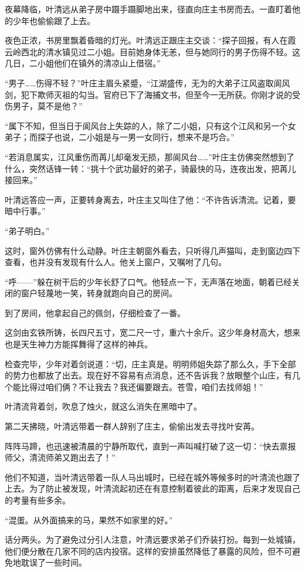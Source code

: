 夜幕降临，叶清远从弟子房中蹑手蹑脚地出来，径直向庄主书房而去。一直盯着他的少年也偷偷跟了上去。

夜色正浓，书房里飘着昏暗的灯光。叶清远正跟庄主交谈：“探子回报，有人在霞云岭西北的清水镇见过二小姐。目前她身体无恙，但与她同行的男子伤得不轻。这几日，二小姐他们在镇外的清凉山上借宿。”

“男子……伤得不轻？”叶庄主眉头紧蹙，“江湖盛传，无为的大弟子江风盗取阆风剑，犯下欺师灭祖的勾当。官府已下了海捕文书，但至今一无所获。你刚才说的受伤男子，莫不是他？”

“属下不知，但当日于阆风台上失踪的人，除了二小姐，只有这个江风和另一个女弟子；而探子也说，二小姐是与一男一女同行，想来不是巧合。”

“若消息属实，江风重伤而苒儿却毫发无损，那阆风台……”叶庄主仿佛突然想到了什么，突然话锋一转：“挑十个武功最好的弟子，骑最快的马，连夜出发，把苒儿接回来。”

叶清远答应一声，正要转身离去，叶庄主又叫住了他：“不许告诉清流。记着，要暗中行事。”

“弟子明白。”

这时，窗外仿佛有什么动静。叶庄主朝窗外看去，只听得几声猫叫，走到窗边四下查看，也并没有发现有什么人。他关上窗户，又嘱咐了几句。

“呼——”躲在树干后的少年长舒了口气。他轻点一下，无声落在地面，朝着已经关闭的窗户轻蔑地一笑，转身就跑向自己的房间。

到了房间，他拿起自己的佩剑，仔细检查了一番。

这剑由玄铁所铸，长四尺五寸，宽二尺一寸，重六十余斤。这少年身材高大，想来也是天生神力方能挥舞得了这样的神兵。

检查完毕，少年对着剑说道：“切，庄主真是。明明师姐失踪了那么久，手下全部的势力也都放了出去。现在好不容易有点消息，还不告诉我？放眼整个山庄，有几个能比得过咱们俩？不让我去？我还偏要跟去。苍雪，咱们去找师姐！”

叶清流背着剑，吹息了烛火，就这么消失在黑暗中了。

第二天拂晓，叶清远带着一群人辞别了庄主，偷偷出发去寻找叶安苒。

阵阵马蹄，也迅速被清晨的宁静所取代，直到一声叫喊打破了这一切：“快去禀报师父，清流师弟又跑出去了！”

他们不知道，当叶清远带着一队人马出城时，已经在城外等候多时的叶清流也跟了上去。为了防止被发现，叶清流起初还在有意控制着彼此的距离，后来才发现自己的考量有些多余。

“混蛋。从外面搞来的马，果然不如家里的好。”

话分两头。为了避免过分引人注意，叶清远要求弟子们乔装打扮。每到一处城镇，他们便分散在几家不同的店内投宿。这样的安排虽然降低了暴露的风险，但不可避免地耽误了一些时间。

